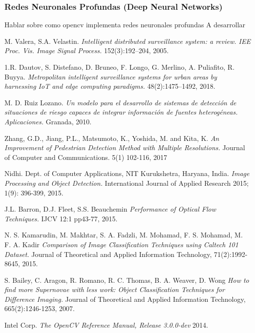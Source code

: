 \documentclass[a4paper,12pt,oneside,spanish]{book}
\begin{document}
\subsubsection{Redes Neuronales Profundas (Deep Neural Networks)}

Hablar sobre como opencv implementa redes neuronales profundas
A desarrollar
















	
\newpage	
\begin{thebibliography}{9}
	M. Valera, S.A. Velastin. \textit{Intelligent distributed surveillance system: a review. IEE Proc. Vis. Image Signal Process.} 152(3):192–204, 2005.
	
	1.R. Dautov, S. Distefano, D. Bruneo, F. Longo, G. Merlino, A. Puliafito, R. Buyya. \textit{Metropolitan intelligent surveillance systems for urban areas by harnessing IoT and edge computing paradigms.} 48(2):1475–1492, 2018.

	M. D. Ruiz Lozano. \textit{Un modelo para el desarrollo de sistemas de detección de situaciones de riesgo capaces de integrar información de fuentes heterogéneas. Aplicaciones.} Granada, 2010.

	Zhang, G.D., Jiang, P.L., Matsumoto, K., Yoshida, M. and Kita, K. \textit{An Improvement of Pedestrian Detection Method with Multiple Resolutions.} Journal of Computer and Communications. 5(1) 102-116, 2017

	Nidhi. Dept. of Computer Applications, NIT Kurukshetra, Haryana, India. \textit{Image Processing and Object Detection.} International Journal of Applied Research 2015; 1(9): 396-399, 2015.
	
	J.L. Barron, D.J. Fleet, S.S. Beauchemin \textit{Performance of Optical Flow Techniques.} IJCV 12:1 pp43-77, 2015.
	
	N. S. Kamarudin, M. Makhtar, S. A. Fadzli, M. Mohamad, F. S. Mohamad, M. F. A. 
	Kadir \textit{Comparison of Image Classification Techniques using Caltech 101 Dataset.} Journal of Theoretical and Applied Information Technology, 71(2):1992-8645, 2015.
	
	S. Bailey, C. Aragon, R. Romano, R. C. Thomas, B. A. Weaver, D. Wong \textit{How to find more Supernovae with less work: Object Classification Techniques for Difference Imaging.} Journal of Theoretical and Applied Information Technology, 665(2):1246-1253, 2007.	
	
	Intel Corp. \textit{The OpenCV Reference Manual, Release 3.0.0-dev} 2014.	
	
	
	
\end{thebibliography}
\end{document}
